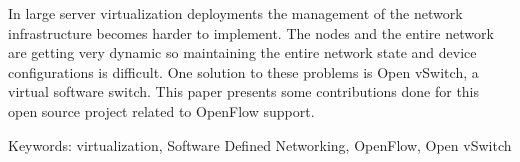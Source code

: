 
In large server virtualization deployments the management of the network infrastructure
becomes harder to implement. The nodes and the entire network are getting very dynamic
so maintaining the entire network state and device configurations is difficult. One
solution to these problems is Open vSwitch, a virtual software switch. This paper
presents some contributions done for this open source project related to OpenFlow
support.



Keywords: virtualization, Software Defined Networking, OpenFlow, Open vSwitch

